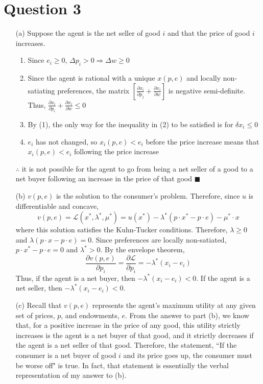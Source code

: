 \documentclass{article}
\renewcommand{\L}{\mathcal{L}}
\begin{document}
\pagebreak
\section*{Question 3}
\begin{itemize}
	\item[(a)] Suppose the agent is the net seller of good $i$ and that the price of good $i$ increases.
		\begin{enumerate} 
			\item Since $e_i\geq 0$, $\Delta p_i>0\Rightarrow\Delta w\geq 0$
			\item Since the agent is rational with a unique $x(p,e)$ and locally non-satiating preferences, the matrix ${[\frac{\partial x_i}{\partial p_j}+\frac{\partial x_i}{\partial w}]}$ is negative semi-definite. Thus, ${\frac{\partial x_i}{\partial p_i}+\frac{\partial x_i}{\partial w}\leq 0}$
			\item By (1), the only way for the inequality in (2) to be satisfied is for $\delta x_i\leq 0$
			\item $e_i$ has not changed, so $x_i(p,e)<e_i$ before the price increase means that $x_i(p,e)<e_i$ following the price increase
		\end{enumerate}
		$\therefore$ it is not possible for the agent to go from being a net seller of a good to a net buyer following an increase in the price of that good $\blacksquare$
	
	\item[(b)] $v(p,e)$ is the solution to the consumer's problem. Therefore, since $u$ is differentiable and concave,
		\[
			v(p,e)=\L(x^*,\lambda^*,\mu^*) = u(x^*)-\lambda^*(p\cdot x^*-p\cdot e) - \mu^*\cdot x
		\]
		where this solution satisfies the Kuhn-Tucker conditions. Therefore, $\lambda\geq 0$ and $\lambda(p\cdot x-p\cdot e)=0$. Since preferences are locally non-satiated, $p\cdot x^*-p\cdot e=0$ and $\lambda^*>0$. By the envelope theorem,
		\[
			\frac{\partial v(p,e)}{\partial p_i} = \frac{\partial\L}{\partial p_i} = -\lambda^*(x_i - e_i)
		\]
		 Thus, if the agent is a net buyer, then $-\lambda^*(x_i - e_i)<0$. If the agent is a net seller, then $-\lambda^*(x_i - e_i)<0$.
		
	\item[(c)] Recall that $v(p,e)$ represents the agent's maximum utility at any given set of prices, $p$, and endowments, $e$. From the answer to part (b), we know that, for a positive increase in the price of any good, this utility strictly increases is the agent is a net buyer of that good, and it strictly decreases if the agent is a net seller of that good. Therefore, the statement, ``If the consumer is a net buyer of good $i$ and its price goes up, the consumer must be worse off" is true. In fact, that statement is essentially the verbal representation of my answer to (b).
	
\end{itemize}



\end{document}
